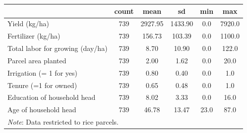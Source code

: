 \begin{tabular}{l*{5}{c}}
\toprule
                    &       count&        mean&          sd&         min&         max\\
\midrule
Yield (kg/ha)       &         739&     2927.95&     1433.90&         0.0&      7920.0\\
Fertilizer (kg/ha)  &         739&      156.73&      103.39&         0.0&      1100.0\\
Total labor for growing (day/ha)&         739&        8.70&       10.90&         0.0&       122.0\\
Parcel area planted &         739&        2.00&        1.62&         0.0&        20.0\\
Irrigation (= 1 for yes)&         739&        0.80&        0.40&         0.0&         1.0\\
Tenure (=1 for owned)&         739&        0.65&        0.48&         0.0&         1.0\\
Education of household head&         739&        8.02&        3.33&         0.0&        16.0\\
Age of household head&         739&       46.78&       13.47&        23.0&        87.0\\
\bottomrule
\multicolumn{6}{p{0.8\linewidth}}{\footnotesize 
\textit{Note}: Data restricted to rice parcels.} \\ 
\end{tabular}

